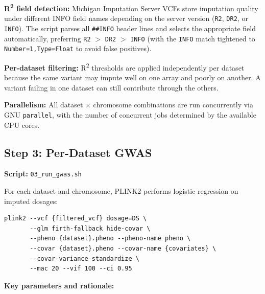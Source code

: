 \documentclass[11pt,letterpaper]{article}
\begin{document}
\textbf{R\textsuperscript{2} field detection:} Michigan Imputation Server VCFs store imputation quality under different INFO field names depending on the server version (\texttt{R2}, \texttt{DR2}, or \texttt{INFO}). The script parses all \texttt{\#\#INFO} header lines and selects the appropriate field automatically, preferring \texttt{R2} $>$ \texttt{DR2} $>$ \texttt{INFO} (with the \texttt{INFO} match tightened to \texttt{Number=1,Type=Float} to avoid false positives).

\textbf{Per-dataset filtering:} R\textsuperscript{2} thresholds are applied independently per dataset because the same variant may impute well on one array and poorly on another. A variant failing in one dataset can still contribute through the others.

\textbf{Parallelism:} All dataset $\times$ chromosome combinations are run concurrently via GNU \texttt{parallel}, with the number of concurrent jobs determined by the available CPU cores.

\subsection{Step 3: Per-Dataset GWAS}
\label{sec:step3}

\textbf{Script:} \texttt{03\_run\_gwas.sh}

For each dataset and chromosome, PLINK2 performs logistic regression on imputed dosages:

\begin{verbatim}
plink2 --vcf {filtered_vcf} dosage=DS \
       --glm firth-fallback hide-covar \
       --pheno {dataset}.pheno --pheno-name pheno \
       --covar {dataset}.pheno --covar-name {covariates} \
       --covar-variance-standardize \
       --mac 20 --vif 100 --ci 0.95
\end{verbatim}

\textbf{Key parameters and rationale:}
\end{document}
